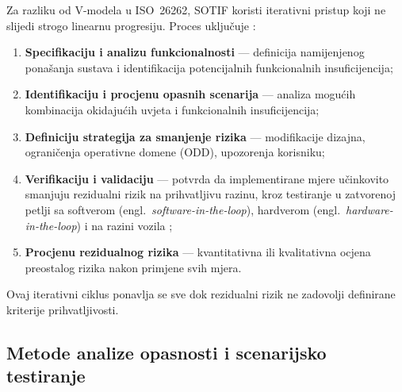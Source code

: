 Za razliku od V-modela u ISO~26262, SOTIF koristi iterativni pristup koji ne slijedi strogo linearnu progresiju. Proces uključuje \cite{iso21448, patel2025sotifslr}:

\begin{enumerate}
  \item \textbf{Specifikaciju i analizu funkcionalnosti} — definicija namijenjenog ponašanja sustava i identifikacija potencijalnih funkcionalnih insuficijencija;
  \item \textbf{Identifikaciju i procjenu opasnih scenarija} — analiza mogućih kombinacija okidajućih uvjeta i funkcionalnih insuficijencija;
  \item \textbf{Definiciju strategija za smanjenje rizika} — modifikacije dizajna, ograničenja operativne domene (ODD), upozorenja korisniku;
  \item \textbf{Verifikaciju i validaciju} — potvrda da implementirane mjere učinkovito smanjuju rezidualni rizik na prihvatljivu razinu, kroz testiranje u zatvorenoj petlji sa softverom (engl.\ \textit{software-in-the-loop}), hardverom (engl.\ \textit{hardware-in-the-loop}) i na razini vozila \cite{patel2025sotifslr};
  \item \textbf{Procjenu rezidualnog rizika} — kvantitativna ili kvalitativna ocjena preostalog rizika nakon primjene svih mjera.
\end{enumerate}

Ovaj iterativni ciklus ponavlja se sve dok rezidualni rizik ne zadovolji definirane kriterije prihvatljivosti.

\subsection{Metode analize opasnosti i scenarijsko testiranje}

